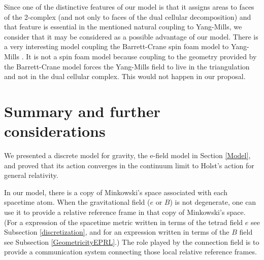 \documentclass{article}
\begin{document}
Since one of the distinctive features of our model is that it assigns areas to faces of the 2-complex (and not only to faces of the dual cellular decomposition) and that feature is essential in the mentioned natural coupling to Yang-Mills, we consider that it may be considered as a possible advantage of our model. 
There is a very interesting model coupling the Barrett-Crane spin foam model to Yang-Mills \cite{Oriti-Pfeiffer}. 
It is not a spin foam model because coupling to the geometry provided by the Barrett-Crane model forces the Yang-Mills field to live in the triangulation and not in the dual cellular complex. This would not happen in our proposal. 







\section{Summary and further considerations}%
\label{Summary}

We presented a discrete model for gravity, the e-field model in Section \ref{Model}, and proved that its action converges in the continuum limit to Holst's action for general relativity. 


In our model, there is a copy of Minkowski's space associated with each spacetime atom. When the gravitational field ($e$ or $B$) is not degenerate, one can use it to provide a relative reference frame in that copy of Minkowski's space. (For a expression of the spacetime metric written in terms of the tetrad field $e$ see Subsection \ref{discretization}, and for an expression written in terms of the $B$ field see Subsection \ref{GeometricityEPRL}.) 
The role played by the connection field is to provide a communication system connecting those local relative reference frames. 
\end{document}
